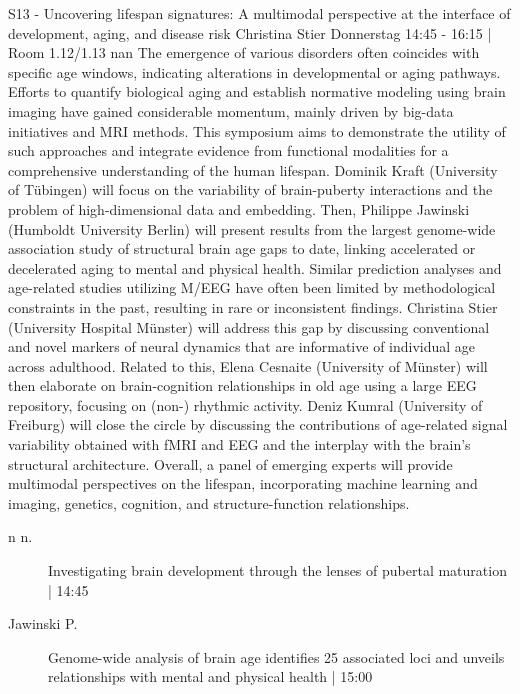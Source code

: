 
            \begin{symposium}
            {S13 - Uncovering lifespan signatures: A multimodal perspective at the interface of development, aging, and disease risk }
            {Christina Stier}
            {Donnerstag 14:45 - 16:15 | Room 1.12/1.13}
            {nan}
            The emergence of various disorders often coincides with specific age windows, indicating alterations in developmental or aging pathways. Efforts to quantify biological aging and establish normative modeling using brain imaging have gained considerable momentum, mainly driven by big-data initiatives and MRI methods. This symposium aims to demonstrate the utility of such approaches and integrate evidence from functional modalities for a comprehensive understanding of the human lifespan.
Dominik Kraft (University of Tübingen) will focus on the variability of brain-puberty interactions and the problem of high-dimensional data and embedding. Then, Philippe Jawinski (Humboldt University Berlin) will present results from the largest genome-wide association study of structural brain age gaps to date, linking accelerated or decelerated aging to mental and physical health. Similar prediction analyses and age-related studies utilizing M/EEG have often been limited by methodological constraints in the past, resulting in rare or inconsistent findings. Christina Stier (University Hospital Münster) will address this gap by discussing conventional and novel markers of neural dynamics that are informative of individual age across adulthood. Related to this, Elena Cesnaite (University of Münster) will then elaborate on brain-cognition relationships in old age using a large EEG repository, focusing on (non-) rhythmic activity. Deniz Kumral (University of Freiburg) will close the circle by discussing the contributions of age-related signal variability obtained with fMRI and EEG and the interplay with the brain’s structural architecture.
Overall, a panel of emerging experts will provide multimodal perspectives on the lifespan, incorporating machine learning and imaging, genetics, cognition, and structure-function relationships.
            \begin{description}    
            
                \item [n n.] Investigating brain development through the lenses of pubertal maturation \textcolor{mygray}{ | 14:45}    
                
                \item [ Jawinski P.] Genome-wide analysis of brain age identifies 25 associated loci and unveils relationships with mental and physical health \textcolor{mygray}{ | 15:00}    
                

\end{description}
\end{symposium}
